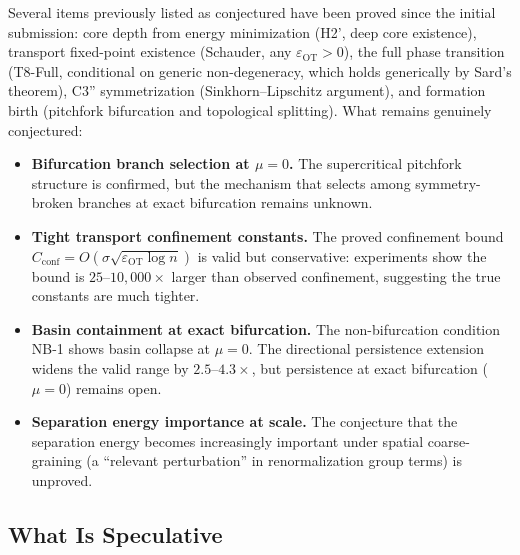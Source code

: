 \documentclass[lettersize,journal]{IEEEtran}
\begin{document}
Several items previously listed as conjectured have been proved since the initial submission: core depth from energy minimization (H2', deep core existence), transport fixed-point existence (Schauder, any $\varepsilon_{\mathrm{OT}} > 0$), the full phase transition (T8-Full, conditional on generic non-degeneracy, which holds generically by Sard's theorem), C3'' symmetrization (Sinkhorn--Lipschitz argument), and formation birth (pitchfork bifurcation and topological splitting). What remains genuinely conjectured:

\begin{itemize}
\item \textbf{Bifurcation branch selection at $\mu = 0$.} The supercritical pitchfork structure is confirmed, but the mechanism that selects among symmetry-broken branches at exact bifurcation remains unknown.

\item \textbf{Tight transport confinement constants.} The proved confinement bound $C_{\mathrm{conf}} = O(\sigma \sqrt{\varepsilon_{\mathrm{OT}} \log n})$ is valid but conservative: experiments show the bound is $25$--$10{,}000\times$ larger than observed confinement, suggesting the true constants are much tighter.

\item \textbf{Basin containment at exact bifurcation.} The non-bifurcation condition NB-1 shows basin collapse at $\mu = 0$. The directional persistence extension widens the valid range by $2.5$--$4.3\times$, but persistence at exact bifurcation ($\mu = 0$) remains open.

\item \textbf{Separation energy importance at scale.} The conjecture that the separation energy becomes increasingly important under spatial coarse-graining (a ``relevant perturbation'' in renormalization group terms) is unproved.
\end{itemize}

\subsection{What Is Speculative}
\end{document}
